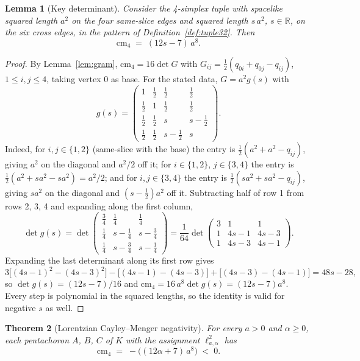 \documentclass[11pt]{article}
\newtheorem{theorem}{Theorem}[section]
\newtheorem{lemma}[theorem]{Lemma}
\theoremstyle{definition}
\theoremstyle{remark}
\newcommand{\cm}{\mathrm{cm}_{4}}
\newcommand{\R}{\mathbb{R}}
\newcommand{\Kmin}{K}
\newcommand{\ltwo}{\ell^{2}_{a,\alpha}}
\begin{document}
\begin{lemma}[Key determinant]
\label{lem:keydet}
Consider the 4-simplex tuple with spacelike squared length $a^{2}$ on the four same-slice edges and squared length $s\,a^{2}$, $s\in\R$, on the six cross edges, in the pattern of Definition~\ref{def:tuple32}. Then
\[
\cm \;=\; (12s-7)\,a^{8}.
\]
\end{lemma}

\begin{proof}
By Lemma~\ref{lem:gram}, $\cm=16\det G$ with $G_{ij}=\tfrac12(q_{0i}+q_{0j}-q_{ij})$, $1\le i,j\le 4$, taking vertex $0$ as base. For the stated data, $G=a^{2}g(s)$ with
\[
g(s)=
\begin{pmatrix}
1 & \tfrac12 & \tfrac12 & \tfrac12\\
\tfrac12 & 1 & \tfrac12 & \tfrac12\\
\tfrac12 & \tfrac12 & s & s-\tfrac12\\
\tfrac12 & \tfrac12 & s-\tfrac12 & s
\end{pmatrix}.
\]
Indeed, for $i,j\in\{1,2\}$ (same-slice with the base) the entry is $\tfrac12(a^{2}+a^{2}-q_{ij})$, giving $a^{2}$ on the diagonal and $a^{2}/2$ off it; for $i\in\{1,2\}$, $j\in\{3,4\}$ the entry is $\tfrac12(a^{2}+sa^{2}-sa^{2})=a^{2}/2$; and for $i,j\in\{3,4\}$ the entry is $\tfrac12(sa^{2}+sa^{2}-q_{ij})$, giving $sa^{2}$ on the diagonal and $(s-\tfrac12)a^{2}$ off it. Subtracting half of row 1 from rows 2, 3, 4 and expanding along the first column,
\[
\det g(s)=
\det
\begin{pmatrix}
\tfrac34 & \tfrac14 & \tfrac14\\
\tfrac14 & s-\tfrac14 & s-\tfrac34\\
\tfrac14 & s-\tfrac34 & s-\tfrac14
\end{pmatrix}
=\frac{1}{64}
\det
\begin{pmatrix}
3 & 1 & 1\\
1 & 4s-1 & 4s-3\\
1 & 4s-3 & 4s-1
\end{pmatrix}.
\]
Expanding the last determinant along its first row gives
\[
3\bigl[(4s-1)^{2}-(4s-3)^{2}\bigr]-\bigl[(4s-1)-(4s-3)\bigr]+\bigl[(4s-3)-(4s-1)\bigr]
=48s-28,
\]
so $\det g(s)=(12s-7)/16$ and $\cm=16\,a^{8}\det g(s)=(12s-7)a^{8}$. Every step is polynomial in the squared lengths, so the identity is valid for negative $s$ as well.
\end{proof}

\begin{theorem}[Lorentzian Cayley--Menger negativity]
\label{thm:lorentzcm}
For every $a>0$ and $\alpha\ge 0$, each pentachoron $A$, $B$, $C$ of $\Kmin$ with the assignment $\ltwo$ has
\[
\cm \;=\; -\bigl((12\alpha+7)\,a^{8}\bigr) \;<\; 0.
\]
\end{theorem}
\end{document}
